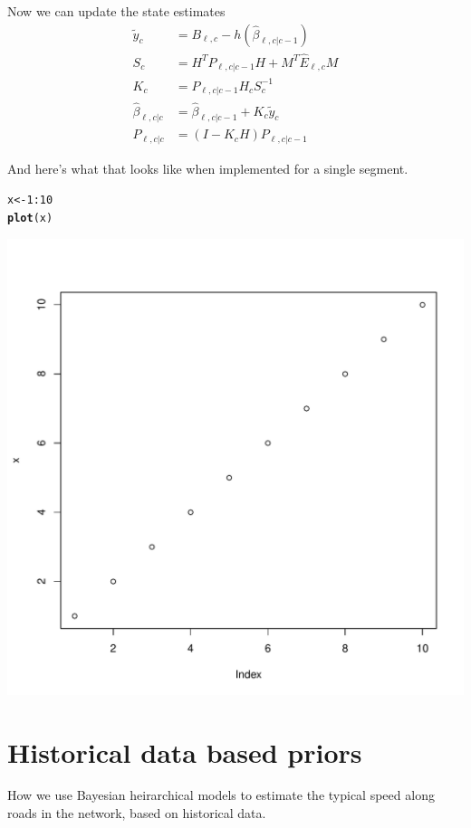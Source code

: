 \documentclass[english]{MastersDoctoralThesis}\usepackage[]{graphicx}\usepackage[]{color}
\makeatletter
\def\maxwidth{ %
  \ifdim\Gin@nat@width>\linewidth
    \linewidth
  \else
    \Gin@nat@width
  \fi
}
\newcommand{\hlnum}[1]{\textcolor[rgb]{0.686,0.059,0.569}{#1}}%
\newcommand{\hlopt}[1]{\textcolor[rgb]{0,0,0}{#1}}%
\newcommand{\hlstd}[1]{\textcolor[rgb]{0.345,0.345,0.345}{#1}}%
\newcommand{\hlkwb}[1]{\textcolor[rgb]{0.69,0.353,0.396}{#1}}%
\newcommand{\hlkwd}[1]{\textcolor[rgb]{0.737,0.353,0.396}{\textbf{#1}}}%
\newenvironment{kframe}{%
 \def\at@end@of@kframe{}%
 \ifinner\ifhmode%
  \def\at@end@of@kframe{\end{minipage}}%
  \begin{minipage}{\columnwidth}%
 \fi\fi%
 \def\FrameCommand##1{\hskip\@totalleftmargin \hskip-\fboxsep
 \colorbox{shadecolor}{##1}\hskip-\fboxsep
     \hskip-\linewidth \hskip-\@totalleftmargin \hskip\columnwidth}%
 \MakeFramed {\advance\hsize-\width
   \@totalleftmargin\z@ \linewidth\hsize
   \@setminipage}}%
 {\par\unskip\endMakeFramed%
 \at@end@of@kframe}
\newenvironment{knitrout}{}{} %
\makeatother
\begin{document}
Now we can update the state estimates
\begin{align}
    \label{eq:kf_update_resid}
    \tilde y_c &= B_{\ell,c} - h(\hat\beta_{\ell,c|c-1}) \\
    \label{eq:kf_update_Sk}
    S_c &= H^T P_{\ell,c|c-1} H + M^T \hat E_{\ell,c} M \\
    \label{eq:kf_update_gain}
    K_c &= P_{\ell,c|c-1} H_c S_c^{-1} \\
    \label{eq:kf_update_statemean}
    \hat\beta_{\ell,c|c} &= \hat\beta_{\ell,c|c-1} + K_c\tilde y_c \\
    \label{eq:kf_update_statevar}
    P_{\ell,c|c} &= (I - K_c H) P_{\ell,c|c-1}
\end{align}

And here's what that looks like when implemented for a single segment.
\begin{knitrout}
\color{fgcolor}\begin{kframe}
\begin{alltt}
\hlstd{x} \hlkwb{<-} \hlnum{1}\hlopt{:}\hlnum{10}
\hlkwd{plot}\hlstd{(x)}
\end{alltt}
\end{kframe}
\includegraphics[width=\maxwidth]{figure/kf_eg-1} 

\end{knitrout}




\chapter{Historical data based priors}
\label{cha:historymodel}

How we use Bayesian heirarchical models to
estimate the typical speed along roads in the
network, based on historical data.


\appendix
\end{document}
